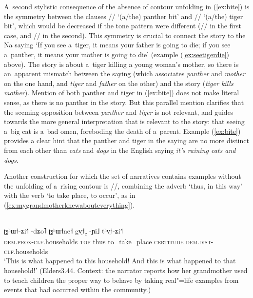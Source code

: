 A~second stylistic consequence of the absence of contour unfolding in (\ref{ex:bite}) is the symmetry between the clauses // ‘(a/the) panther bit’ and // ‘(a/the) tiger bit’, which would be decreased if the tone pattern were different (// in the first case, and // in the second). This symmetry is crucial to connect the story to the Na saying ‘If you see a~tiger, it means your father is going to die; if you see a~panther, it means your mother is going to die’ (example (\ref{ex:seetigerdie}) above). The story is about a~tiger killing a young woman's mother, so there is an~apparent mismatch between the saying (which associates \textit{panther} and \textit{mother} on the one hand, and \textit{tiger} and \textit{father} on the other) and the story (\textit{tiger kills mother}). Mention of both panther and tiger in (\ref{ex:bite}) does not make literal sense, as there is no panther in the story. But this parallel mention clarifies that the seeming opposition between \textit{panther} and \textit{tiger} is not relevant, and guides towards the more general interpretation that is relevant to the story: that seeing a~big cat is a~bad omen, foreboding the death of a~parent. Example (\ref{ex:bite}) provides a clear hint that the panther and tiger in the saying are no more distinct from each other than \textit{cats} and \textit{dogs} in the {English} saying \textit{it's raining cats and dogs}.

\newpage 
Another construction for which the set of narratives contains examples without the unfolding of
a~rising contour is //, combining the adverb ‘thus, in this way’ with the verb ‘to
take place, to occur’, as in (\ref{ex:mygrandmotherknewabouteverything}).
\begin{exe}
  \ex
  \label{ex:mygrandmotherknewabouteverything}
  \\
  \gll ʈʂʰɯ˧-ʑi˧˥	-dʑo˥	ʈʂʰɯ˧ne˧	gv̩˧\textsubscript{c}		-ɲi˩		tʰv̩˧-ʑi˧˥\\
  \textsc{dem.prox}-\textsc{clf}.households		\textsc{top}	thus to\_take\_place		\textsc{certitude}	 \textsc{dem.dist}-\textsc{clf}.households\\
  \glt ‘This is what happened to this household! And this is what happened to that household!' (Elders3.44. Context: the narrator reports how her grandmother used to teach children the proper way to behave by taking real"=life examples from events that had occurred within the community.) 
\end{exe}

